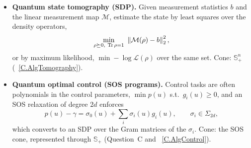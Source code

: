 \documentclass[handoutsbeamer.tex]{subfiles}
\begin{document}
\begin{frame}
\onp{\begin{center}\resizebox{\linewidth}{!}{}\end{center}}
\end{frame}

\begin{frame}
\begin{itemize}\setlength\itemsep{0.5em}
    \item \textbf{Quantum state tomography (SDP).} Given measurement statistics $b$ and the linear measurement map $\mathcal M$, estimate the state by least squares over the density operators,
    \[
    \min_{\rho\succeq0,\ \operatorname{Tr}\rho=1}\ \left\lVert \mathcal M(\rho)-b \right\rVert_2^2 ,
    \]
    or by maximum likelihood, $\min -\log\mathcal L(\rho)$ over the same set. Cone: $\mathbb S^n_+$ (\Chap~\ref{C.AlgTomography}).
    \item \textbf{Quantum optimal control (SOS programs).} Control tasks are often polynomials in the control parameters, $\min p(u)$ s.t.\ $g_i(u)\ge0$, and an SOS relaxation of degree $2d$ enforces
    \[
    p(u)-\gamma=\sigma_0(u)+\sum_i\sigma_i(u)g_i(u),\qquad \sigma_i\in\Sigma_{2d},
    \]
    which converts to an SDP over the Gram matrices of the $\sigma_i$. Cone: the SOS cone, represented through $\mathbb S_+$ (Question~C and \Chap~\ref{C.AlgControl}).
\end{itemize}
\end{frame}
\end{document}

